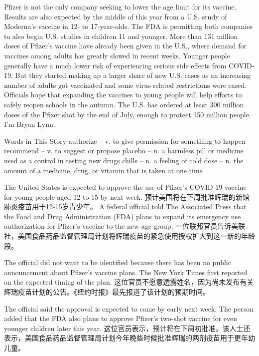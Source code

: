 Pfizer is not the only company seeking to lower the age limit for its vaccine. Results are also expected by the middle of this year from a U.S. study of Moderna's vaccine in 12- to 17-year-olds.
The FDA is permitting both companies to also begin U.S. studies in children 11 and younger.
More than 131 million doses of Pfizer's vaccine have already been given in the U.S., where demand for vaccines among adults has greatly slowed in recent weeks.
Younger people generally have a much lower risk of experiencing serious side effects from COVID-19. But they started making up a larger share of new U.S. cases as an increasing number of adults got vaccinated and some virus-related restrictions were eased.
Officials hope that expanding the vaccines to young people will help efforts to safely reopen schools in the autumn.
The U.S. has ordered at least 300 million doses of the Pfizer shot by the end of July, enough to protect 150 million people.
I'm Bryan Lynn.

\begin{messagebox}
Words in This Story
authorize – v. to give permission for something to happen
recommend – v. to suggest or propose
placebo – n. a harmless pill or medicine used as a control in testing new drugs
chills – n. a feeling of cold
dose – n. the amount of a medicine, drug, or vitamin that is taken at one time
\end{messagebox}

The United States is expected to approve the use of Pfizer’s COVID-19 vaccine for young people aged 12 to 15 by next week.
预计美国将在下周批准辉瑞的新馆肺炎疫苗用于12-15岁青少年。
A federal official told The Associated Press that the Food and Drug Administration (FDA) plans to expand its emergency use authorization for Pfizer’s vaccine to the new age group.
一位联邦官员告诉美联社，美国食品药品监督管理局计划将辉瑞疫苗的紧急使用授权扩大到这一新的年龄段。

The official did not want to be identified because there has been no public announcement about Pfizer’s vaccine plans. The New York Times first reported on the expected timing of the plan.
这位官员不愿意透露姓名，因为尚未发布有关辉瑞疫苗计划的公告。《纽约时报》最先报道了该计划的预期时间。

The official said the approval is expected to come by early next week. The person added that the FDA also plans to approve Pfizer’s two-shot vaccine for even younger children later this year.
这位官员表示，预计将在下周初批准。该人士还表示，美国食品药品监督管理局计划今年晚些时候批准辉瑞的两剂疫苗用于更年幼儿童。

